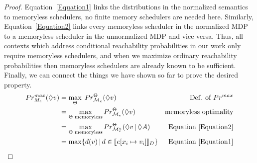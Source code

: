 \begin{proof}
	Equation~\ref{Equation1} links the distributions in the normalized semantics to memoryless schedulers, no finite memory schedulers are needed here.
	Similarly, Equation~\ref{Equation2} links every memoryless scheduler in the normalized MDP to a memoryless scheduler in the unnormalized MDP and vice versa.
	Thus, all contexts which address conditional reachability probabilities in our work only require memoryless schedulers, and when we maximize ordinary reachability probabilities then memoryless schedulers are already known to be sufficient.
	Finally, we can connect the things we have shown so far to prove the desired property.
	\begin{align*}
		Pr^{max}_{M_e} (\lozenge v) 
		&=  \max\limits_{\Theta}\; Pr^{\Theta }_{\mathcal{M}_e} (\lozenge v) & \text{Def. of $Pr^{max}$}\\
		&= \max\limits_{\Theta \text{ memoryless}} Pr^{\Theta }_{\mathcal{M}_e} (\lozenge v)  & \text{memoryless optimality}\\
		&= \max\limits_{\Theta \text{ memoryless}} Pr^{\Theta }_{\mathcal{M}^u_e} (\lozenge v \,|\, \lozenge A) & \text{Equation \ref{Equation2}} \\
		&= \max \{d(v) \,|\, d \in \llbracket e[x_i\mapsto v_i]\rrbracket_D\} & \text{Equation \ref{Equation1}}
	\end{align*}
\end{proof}


